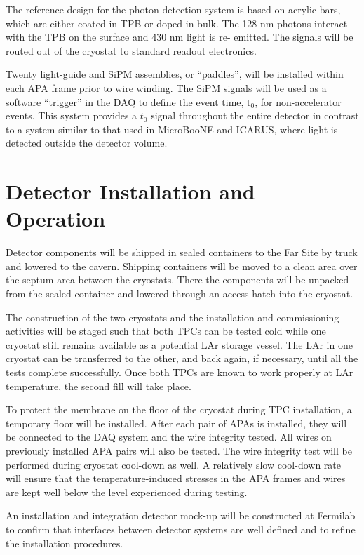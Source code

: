 The reference design for the photon detection system is based on acrylic bars, which are either coated in 
TPB or doped in bulk. The 128 nm photons interact with the TPB on the surface and 430 nm light is re-
emitted. The signals will be routed out of the cryostat to standard readout electronics.

Twenty light-guide and SiPM assemblies, or ``paddles'', will be installed within each APA frame prior to wire winding. The SiPM signals will be used as a software ``trigger'' in the DAQ to define the event time, t$_0$, for non-accelerator events. This system provides a $t_0$ signal throughout the entire detector in contrast to a system similar to that used in MicroBooNE and ICARUS, where light is detected outside the detector volume. 

\section{Detector Installation and Operation}
\label{sec:det-install}

Detector components will be shipped in sealed containers to the Far Site by truck and lowered to the cavern. Shipping containers will be moved to a clean area over the septum area between the cryostats. There the components will be unpacked from the sealed container and lowered  through an access hatch into the cryostat. 

The construction of the two cryostats and the installation and commissioning activities will
be staged such that both TPCs can be tested cold while one cryostat still remains available
as a potential LAr storage vessel. The LAr in one cryostat can be transferred to the other, and
back again, if necessary, until all the tests complete successfully. Once both TPCs are known to work properly at LAr temperature, the second fill will take place.

To protect the membrane on the floor of the cryostat during TPC installation, a temporary floor will be installed. 
After each pair of APAs is installed, they will be connected to the DAQ system and the wire integrity tested. All wires on previously installed APA pairs will also be tested. The wire integrity test will be performed during cryostat cool-down as well. A relatively slow cool-down rate will ensure that the temperature-induced stresses in the APA frames and wires are kept well below the level experienced during testing. 

An installation and integration detector mock-up will be constructed at Fermilab to confirm that interfaces between detector systems are well defined and to refine the installation procedures. 


